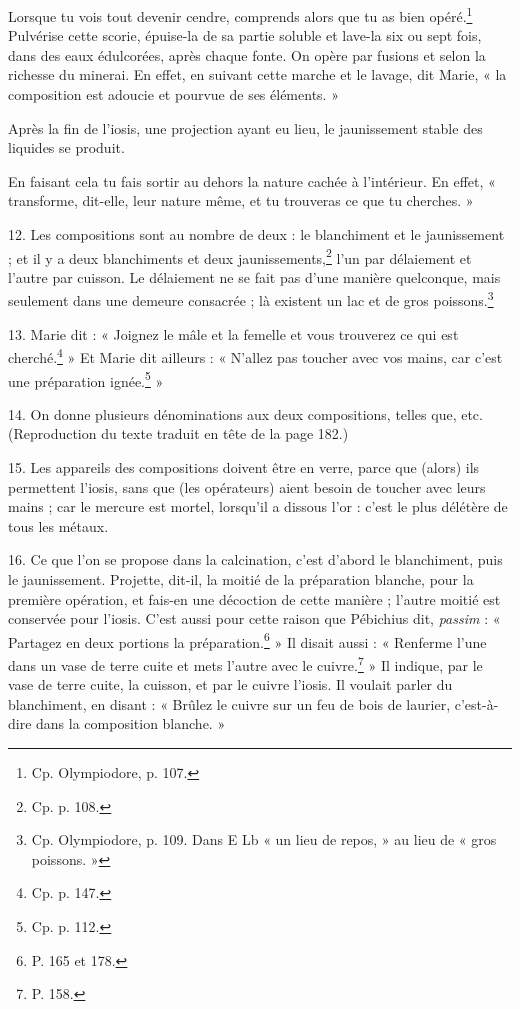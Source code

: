 \documentclass[a4paper, 11pt, oneside, polutonikogreek, french]{article}
\begin{document}
Lorsque tu vois tout devenir cendre, comprends alors que tu as bien opéré.\footnote{Cp. Olympiodore, p. 107.} Pulvérise cette scorie, épuise-la de sa partie soluble et lave-la six ou sept fois, dans des eaux édulcorées, après chaque fonte. On opère par fusions et selon la richesse du minerai. En effet, en suivant cette marche et le lavage, dit Marie, « la composition est adoucie et pourvue de ses éléments. »

Après la fin de l'iosis, une projection ayant eu lieu, le jaunissement stable des liquides se produit.

En faisant cela tu fais sortir au dehors la nature cachée à l'intérieur. En effet, « transforme, dit-elle, leur nature même, et tu trouveras ce que tu cherches. »

12. Les compositions sont au nombre de deux : le blanchiment et le jaunissement ; et il y a deux blanchiments et deux jaunissements,\footnote{Cp. p. 108.} l'un par délaiement et l'autre par cuisson. Le délaiement ne se fait pas d'une manière quelconque, mais seulement dans une demeure consacrée ; là existent un lac et de gros poissons.\footnote{Cp. Olympiodore, p. 109. Dans E Lb « un lieu de repos, » au lieu de « gros poissons. »}

13. Marie dit : « Joignez le mâle et la femelle et vous trouverez ce qui est cherché.\footnote{Cp. p. 147.} » Et Marie dit ailleurs : « N'allez pas toucher avec vos mains, car c'est une préparation ignée.\footnote{Cp. p. 112.} »

14. On donne plusieurs dénominations aux deux compositions, telles que, etc. (Reproduction du texte traduit en tête de la page 182.)

15. Les appareils des compositions doivent être en verre, parce que (alors) ils permettent l'iosis, sans que (les opérateurs) aient besoin de toucher avec leurs mains ; car le mercure est mortel, lorsqu'il a dissous l'or : c'est le plus délétère de tous les métaux.

16. Ce que l'on se propose dans la calcination, c'est d'abord le blanchiment, puis le jaunissement. Projette, dit-il, la moitié de la préparation blanche, pour la première opération, et fais-en une décoction de cette manière ; l'autre moitié est conservée pour l'iosis. C'est aussi pour cette raison que Pébichius dit, \emph{passim} : « Partagez en deux portions la préparation.\footnote{P. 165 et 178.} » Il disait aussi : « Renferme l'une dans un vase de terre cuite et mets l'autre avec le cuivre.\footnote{P. 158.} » Il indique, par le vase de terre cuite, la cuisson, et par le cuivre l'iosis. Il voulait parler du blanchiment, en disant : « Brûlez le cuivre sur un feu de bois de laurier, c'est-à-dire dans la composition blanche. »
\end{document}
